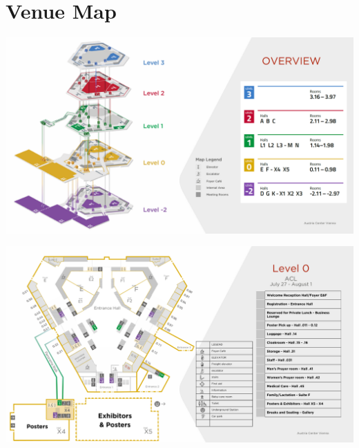 \chapter{Venue Map}
\vspace*{0.2cm}
\includegraphics[width=1.0\linewidth]{examples/acl25-handbook/venue_map/acl25_map-1.pdf}
\newpage

\begin{center}
\includegraphics[height=0.82\linewidth, angle=90]{examples/acl25-handbook/venue_map/acl25_map-2.pdf}
\end{center}
\newpage

